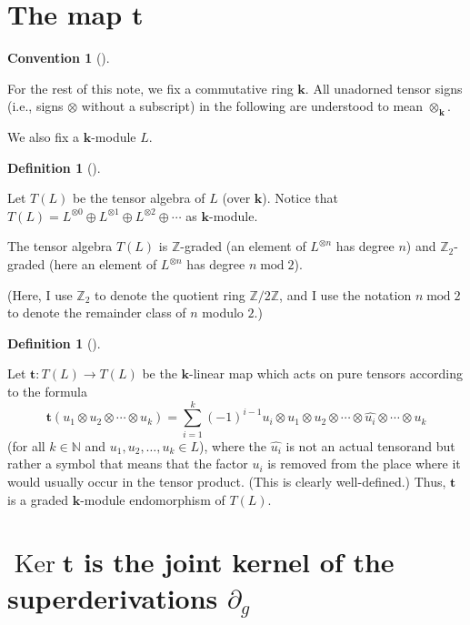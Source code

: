 \documentclass[numbers=enddot,12pt,final,onecolumn,notitlepage]{scrartcl}%
\theoremstyle{definition}
\newtheorem{defi}[theo]{Definition}
\newenvironment{definition}[1][]
{\begin{defi}[#1]\begin{leftbar}}
{\end{leftbar}\end{defi}}
\newtheorem{conv}[theo]{Convention}
\newenvironment{condition}[1][]
{\begin{conv}[#1]\begin{leftbar}}
{\end{leftbar}\end{conv}}
\let\sumnonlimits\sum
\renewcommand{\sum}{\sumnonlimits\limits}
\begin{document}
\section{The map $\mathbf{t}$}

\begin{condition}
For the rest of this note, we fix a commutative ring $\mathbf{k}$. All
unadorned tensor signs (i.e., signs $\otimes$ without a subscript) in the
following are understood to mean $\otimes_{\mathbf{k}}$.

We also fix a $\mathbf{k}$-module $L$.
\end{condition}

\begin{definition}
Let $T\left(  L\right)  $ be the tensor algebra of $L$ (over $\mathbf{k}$).
Notice that $T\left(  L\right)  =L^{\otimes0}\oplus L^{\otimes1}\oplus
L^{\otimes2}\oplus\cdots$ as $\mathbf{k}$-module.

The tensor algebra $T\left(  L\right)  $ is $\mathbb{Z}$-graded (an element of
$L^{\otimes n}$ has degree $n$) and $\mathbb{Z}_{2}$-graded (here an element
of $L^{\otimes n}$ has degree $n\operatorname{mod}2$).
\end{definition}

(Here, I use $\mathbb{Z}_{2}$ to denote the quotient ring $\mathbb{Z}%
/2\mathbb{Z}$, and I use the notation $n\operatorname{mod}2$ to denote the
remainder class of $n$ modulo $2$.)

\begin{definition}
\label{def.t}Let $\mathbf{t}:T\left(  L\right)  \rightarrow T\left(  L\right)
$ be the $\mathbf{k}$-linear map which acts on pure tensors according to the
formula%
\[
\mathbf{t}\left(  u_{1}\otimes u_{2}\otimes\cdots\otimes u_{k}\right)
=\sum_{i=1}^{k}\left(  -1\right)  ^{i-1}u_{i}\otimes u_{1}\otimes u_{2}%
\otimes\cdots\otimes\widehat{u_{i}}\otimes\cdots\otimes u_{k}%
\]
(for all $k\in\mathbb{N}$ and $u_{1},u_{2},\ldots,u_{k}\in L$), where the
$\widehat{u_{i}}$ is not an actual tensorand but rather a symbol that means
that the factor $u_{i}$ is removed from the place where it would usually occur
in the tensor product. (This is clearly well-defined.) Thus, $\mathbf{t}$ is a
graded $\mathbf{k}$-module endomorphism of $T\left(  L\right)  $.
\end{definition}

\section{$\operatorname*{Ker}\mathbf{t}$ is the joint kernel of the
superderivations $\partial_{g}$}
\end{document}
